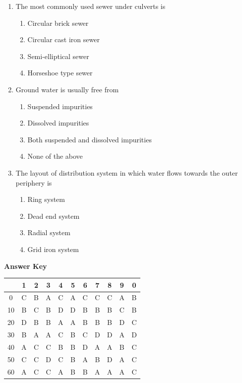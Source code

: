 \documentclass[11pt,a4paper]{article}
\begin{document}
\begin{enumerate}
\item{The most commonly used sewer under culverts is}
\begin{enumerate}[label=\Alph*.]
\item{Circular brick sewer}
\item{Circular cast iron sewer}
\item{Semi-elliptical sewer}
\item{Horseshoe type sewer}
\end{enumerate}
\item{Ground water is usually free from}
\begin{enumerate}[label=\Alph*.]
\item{Suspended impurities}
\item{Dissolved impurities}
\item{Both suspended and dissolved impurities}
\item{None of the above}
\end{enumerate}
\item{The layout of distribution system in which water flows towards the outer periphery is}
\begin{enumerate}[label=\Alph*.]
\item{Ring system}
\item{Dead end system}
\item{Radial system}
\item{Grid iron system}
\end{enumerate}
\end{enumerate}
\textbf{Answer Key}
\begin{tabular}{ | c | c c c c c c c c c c | }
\hline
 & 1 & 2 & 3 & 4 & 5 & 6 & 7 & 8 & 9 & 0 \\
\hline
0 & C & B & A & C & A & C & C & C & A & B \\
10 & B & C & B & D & D & B & B & B & C & B \\
20 & D & B & B & A & A & B & B & B & D & C \\
30 & B & A & A & C & B & C & D & D & A & D \\
40 & A & C & C & B & B & D & A & A & B & C \\
50 & C & C & D & C & B & A & B & D & A & C \\
60 & A & C & C & A & B & B & A & A & A & C \\
\hline
\end{tabular}
\clearpage
\end{document}
